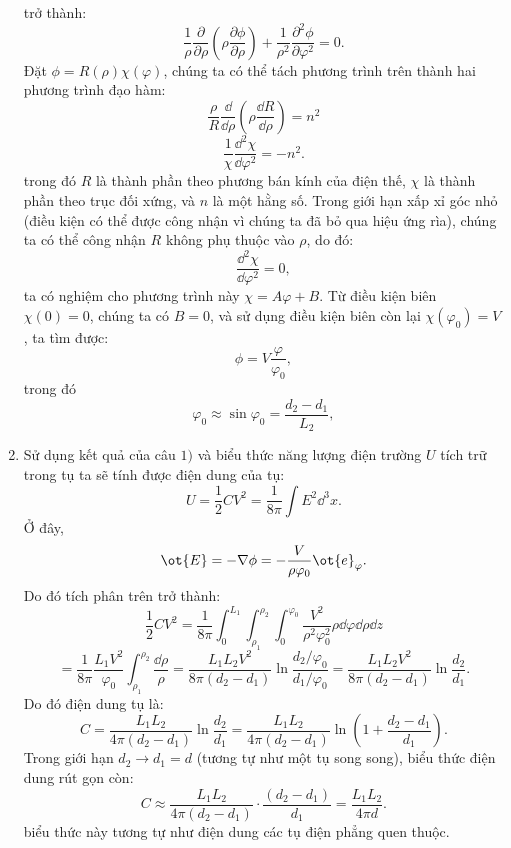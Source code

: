 \begin{loigiai}
\begin{enumerate}[1)]
\begin{center}
\begin{tikzpicture}[x=0.75pt,y=0.75pt,yscale=-1,xscale=1]
\end{tikzpicture}
\end{center}
trở thành:
   $$\frac{1}{\rho}\frac{\partial}{\partial\rho}\left(\rho\frac{\partial\phi}{\partial\rho}\right) + \frac{1}{\rho^2}\frac{\partial^2 \phi}{\partial \varphi^2} = 0.$$
Đặt $\phi=R(\rho)\chi(\varphi)$, chúng ta có thể tách phương trình trên thành hai phương trình đạo hàm:
     $$\frac{\rho}{R} \frac{\dd}{\dd\rho}\left(\rho\frac{\dd R}{\dd\rho}\right) = n^2$$
     $$\frac{1}{\chi} \frac{\dd^2 \chi}{\dd \varphi^2} = -n^2.$$
trong đó $R$ là thành phần theo phương bán kính của điện thế, $\chi$ là thành phần theo trục đối xứng, và $n$ là một hằng số. Trong giới hạn xấp xỉ góc nhỏ (điều kiện có thể được công nhận vì chúng ta đã bỏ qua hiệu ứng rìa), chúng ta có thể công nhận $R$ không phụ thuộc vào $\rho$, do đó:
  $$\frac{\dd^2\chi}{\dd \varphi^2} =0,$$
ta có nghiệm cho phương trình này $\chi = A\varphi + B$. Từ điều kiện biên $\chi(0) = 0$, chúng ta có $B=0$, và sử dụng điều kiện biên còn lại $\chi(\varphi_0)=V$, ta tìm được:
   $$\phi = V\frac{\varphi}{\varphi_0},$$
trong đó
     $$\varphi_0 \approx \sin\varphi_0 = \frac{d_2 - d_1}{L_2},$$
\item Sử dụng kết quả của câu $1)$ và biểu thức năng lượng điện trường $U$ tích trữ trong tụ ta sẽ tính được điện dung của tụ:
    $$U= \frac{1}{2}CV^2=\frac{1}{8\pi}\int E^2 \dd^3 x.$$
Ở đây,
  $$\ot{E} = -\nabla\phi= -\frac{V}{\rho\varphi_0}\ot{e}_{\varphi}.$$
Do đó tích phân trên trở thành:
 $$\frac{1}{2} C V^{2}=\frac{1}{8 \pi} \int_{0}^{L_{1}} \int_{\rho_{1}}^{\rho_{2}} \int_{0}^{\varphi_{0}} \frac{V^{2}}{\rho^{2} \varphi_{0}^{2}} \rho \dd \varphi \dd \rho \dd z$$
 $$=\frac{1}{8 \pi} \frac{L_{1} V^{2}}{\varphi_{0}} \int_{\rho_{1}}^{\rho_{2}} \frac{\dd \rho}{\rho}=\frac{L_{1} L_{2} V^{2}}{8 \pi\left(d_{2}-d_{1}\right)} \ln \frac{d_{2} / \varphi_{0}}{d_{1} / \varphi_{0}}=\frac{L_{1} L_{2} V^{2}}{8 \pi\left(d_{2}-d_{1}\right)} \ln \frac{d_{2}}{d_{1}}.$$
Do đó điện dung tụ là:
    $$C=\frac{L_{1} L_{2}}{4 \pi\left(d_{2}-d_{1}\right)} \ln \frac{d_{2}}{d_{1}}=\frac{L_{1} L_{2}}{4 \pi\left(d_{2}-d_{1}\right)} \ln \left(1+\frac{d_{2}-d_{1}}{d_{1}}\right).$$
Trong giới hạn $d_2\rightarrow d_1=d$ (tương tự như một tụ song song), biểu thức điện dung rút gọn còn:
        $$C \approx \frac{L_1 L_2}{4\pi (d_2 -d_1)}\cdot\frac{(d_2 -d_1)}{d_1} =\frac{L_1 L_2}{4\pi d}.$$
biểu thức này tương tự như điện dung các tụ điện phẳng quen thuộc.
\end{enumerate}
\end{loigiai}


